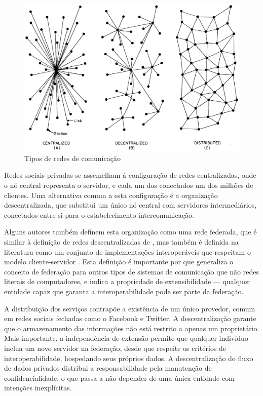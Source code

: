 \begin{figure}[h]
	\centering
		\includegraphics[keepaspectratio=true,scale=0.6]{figuras/org_redes.eps}
	\caption{Tipos de redes de comunicação \cite{baran1964}}
	\label{fig:org_redes}
\end{figure}

Redes sociais privadas se assemelham à configuração de redes centralizadas, onde o
nó central representa o servidor, e cada um dos conectados um dos milhões de
clientes. Uma alternativa comum a esta configuração é a organização descentralizada,
que substitui um único nó central com servidores intermediários, conectados entre si
para o estabelecimento intercomunicação.

Alguns autores também definem esta organização como uma rede federada, que é similar
à definição de redes descentralizadas de \cite{baran1964}, mas também é definida na
literatura como um conjunto de implementações interoperáveis que respeitam o modelo
cliente-servidor \cite{barocas2012}. Esta definição é importante por que generaliza
o conceito de federação para outros tipos de sistemas de comunicação que não redes
literais de computadores, e indica a propriedade de extensibilidade --- qualquer
entidade capaz que garanta a interoperabilidade pode ser parte da federação.

A distribuição dos serviços contrapõe a existência de um único provedor, comum em
redes sociais fechadas como o Facebook e Twitter. A descentralização garante que o
armazenamento das informações não está restrito a apenas um proprietário. Mais
importante, a independência de extensão permite que qualquer indivíduo inclua um
novo servidor na federação, desde que respeite os critérios de interoperabilidade,
hospedando seus próprios dados. A descentralização do fluxo de dados privados
distribui a responsabilidade pela manutenção de confidencialidade, o que passa a não
depender de uma única entidade com intenções inexplícitas.

